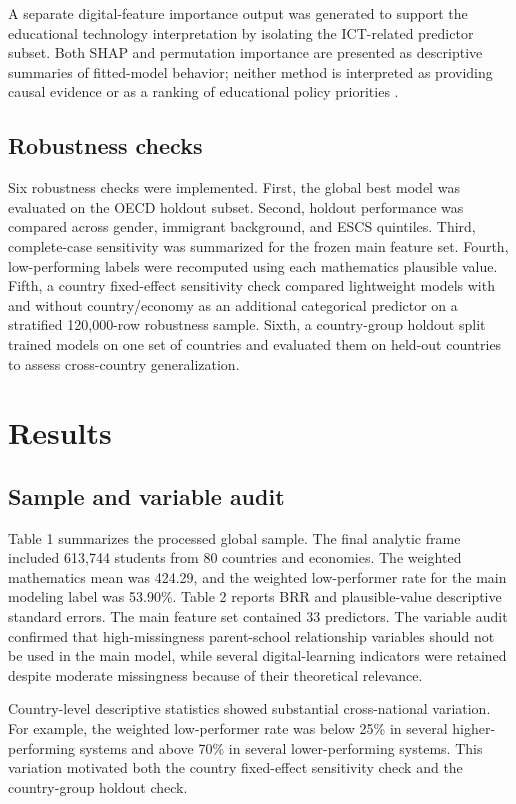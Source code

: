 \documentclass[pdflatex,sn-mathphys-ay]{sn-jnl}
\begin{document}
A separate digital-feature importance output was generated to support the educational technology interpretation by isolating the ICT-related predictor subset. Both SHAP and permutation importance are presented as descriptive summaries of fitted-model behavior; neither method is interpreted as providing causal evidence or as a ranking of educational policy priorities \citep{Molnar_2022,Meylani_2025_xai_tripartite}.

\subsection{Robustness checks}

Six robustness checks were implemented. First, the global best model was evaluated on the OECD holdout subset. Second, holdout performance was compared across gender, immigrant background, and ESCS quintiles. Third, complete-case sensitivity was summarized for the frozen main feature set. Fourth, low-performing labels were recomputed using each mathematics plausible value. Fifth, a country fixed-effect sensitivity check compared lightweight models with and without country/economy as an additional categorical predictor on a stratified 120,000-row robustness sample. Sixth, a country-group holdout split trained models on one set of countries and evaluated them on held-out countries to assess cross-country generalization.

\section{Results}

\subsection{Sample and variable audit}

Table 1 summarizes the processed global sample. The final analytic frame included 613,744 students from 80 countries and economies. The weighted mathematics mean was 424.29, and the weighted low-performer rate for the main modeling label was 53.90\%. Table 2 reports BRR and plausible-value descriptive standard errors. The main feature set contained 33 predictors. The variable audit confirmed that high-missingness parent-school relationship variables should not be used in the main model, while several digital-learning indicators were retained despite moderate missingness because of their theoretical relevance.

Country-level descriptive statistics showed substantial cross-national variation. For example, the weighted low-performer rate was below 25\% in several higher-performing systems and above 70\% in several lower-performing systems. This variation motivated both the country fixed-effect sensitivity check and the country-group holdout check.
\end{document}
